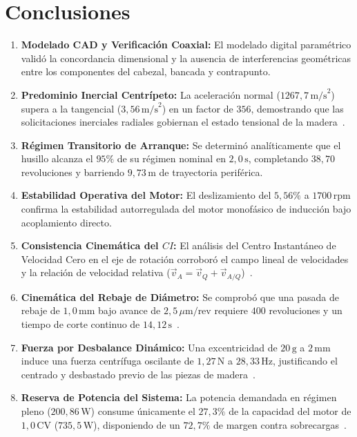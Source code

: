 \documentclass[12pt,a4paper]{article}
\begin{document}
\section{Conclusiones}
\begin{enumerate}[leftmargin=18pt, itemsep=4pt, parsep=2pt]
    \item \textbf{Modelado CAD y Verificación Coaxial:} El modelado digital paramétrico validó la concordancia dimensional y la ausencia de interferencias geométricas entre los componentes del cabezal, bancada y contrapunto.
    \item \textbf{Predominio Inercial Centrípeto:} La aceleración normal ($1267{,}7\,\text{m/s}^2$) supera a la tangencial ($3{,}56\,\text{m/s}^2$) en un factor de $356$, demostrando que las solicitaciones inerciales radiales gobiernan el estado tensional de la madera~\cite{hibbeler2016}.
    \item \textbf{Régimen Transitorio de Arranque:} Se determinó analíticamente que el husillo alcanza el $95\%$ de su régimen nominal en $2{,}0\,\text{s}$, completando $38{,}70$ revoluciones y barriendo $9{,}73\,\text{m}$ de trayectoria periférica.
    \item \textbf{Estabilidad Operativa del Motor:} El deslizamiento del $5{,}56\%$ a $1700\,\text{rpm}$ confirma la estabilidad autorregulada del motor monofásico de inducción bajo acoplamiento directo.
    \item \textbf{Consistencia Cinemática del $CI$:} El análisis del Centro Instantáneo de Velocidad Cero en el eje de rotación corroboró el campo lineal de velocidades y la relación de velocidad relativa ($\vec{v}_A = \vec{v}_Q + \vec{v}_{A/Q}$)~\cite{beer2017, shabana2013}.
    \item \textbf{Cinemática del Rebaje de Diámetro:} Se comprobó que una pasada de rebaje de $1{,}0\,\text{mm}$ bajo avance de $2{,}5\,\mu\text{m/rev}$ requiere $400$ revoluciones y un tiempo de corte continuo de $14{,}12\,\text{s}$~\cite{groover2007}.
    \item \textbf{Fuerza por Desbalance Dinámico:} Una excentricidad de $20\,\text{g}$ a $2\,\text{mm}$ induce una fuerza centrífuga oscilante de $1{,}27\,\text{N}$ a $28{,}33\,\text{Hz}$, justificando el centrado y desbastado previo de las piezas de madera~\cite{nikravesh1988}.
    \item \textbf{Reserva de Potencia del Sistema:} La potencia demandada en régimen pleno ($200{,}86\,\text{W}$) consume únicamente el $27{,}3\%$ de la capacidad del motor de $1{,}0\,\text{CV}$ ($735{,}5\,\text{W}$), disponiendo de un $72{,}7\%$ de margen contra sobrecargas~\cite{boothroyd2006}.

\end{enumerate}
\end{document}
